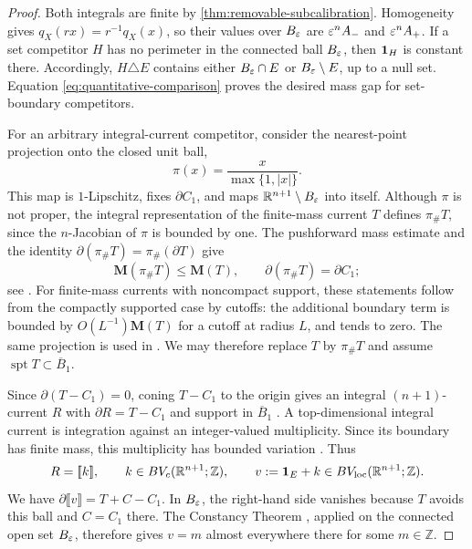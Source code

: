 \begin{proof}
Both integrals are finite by \cref{thm:removable-subcalibration}.
Homogeneity gives \(q_X(rx)=r^{-1}q_X(x)\), so their values over
\(B_\varepsilon\) are \(\varepsilon^nA_-\) and \(\varepsilon^nA_+\).
If a set competitor \(H\) has no perimeter in the connected ball
\(B_\varepsilon\), then \(\mathbf 1_H\) is constant there.  Accordingly,
\(H\triangle E\) contains either \(B_\varepsilon\cap E\) or
\(B_\varepsilon\setminus E\), up to a null set.
Equation \eqref{eq:quantitative-comparison} proves the desired mass gap
for set-boundary competitors.

For an arbitrary integral-current competitor, consider the nearest-point
projection onto the closed unit ball,
\[
 \pi(x)=\frac{x}{\max\{1,|x|\}}.
\]
This map is \(1\)-Lipschitz, fixes \(\partial C_1\), and maps
\(\mathbb R^{n+1}\setminus B_\varepsilon\) into itself.
Although \(\pi\) is not proper, the integral representation of the
finite-mass current \(T\) defines \(\pi_\#T\), since the
\(n\)-Jacobian of \(\pi\) is bounded by one.
The pushforward mass estimate and the identity
\(\partial(\pi_\#T)=\pi_\#(\partial T)\)
give
\[
 \mathbf M(\pi_\#T)\leq\mathbf M(T),
 \qquad \partial(\pi_\#T)=\partial C_1;
\]
see \cite[Remark~26.21(1), Lemma~26.25, and
Remark~27.2(3)]{Simon83}.  For finite-mass currents with noncompact
support, these statements follow from the compactly supported case by
cutoffs: the additional boundary term is bounded by
\(O(L^{-1})\mathbf M(T)\) for a cutoff at radius \(L\), and tends to
zero.  The same projection is used in
\cite[proof of Proposition~1.2]{DeLellisSpadaroSpolaor17}.
We may therefore replace \(T\) by \(\pi_\#T\) and assume
\(\operatorname{spt}T\subset\overline B_1\).

Since \(\partial(T-C_1)=0\), coning \(T-C_1\) to the origin gives an
integral \((n+1)\)-current \(R\) with
\(\partial R=T-C_1\) and support in \(\overline B_1\)
\cite[equation~(26.26) and Remark~27.2(2)--(3)]{Simon83}.
A top-dimensional integral current is integration against an
integer-valued multiplicity.  Since its boundary has finite mass, this
multiplicity has bounded variation
\cite[Remark~26.28]{Simon83}.  Thus
\[
 R=[\![ k]\!],
 \qquad k\in BV_c(\mathbb R^{n+1};\mathbb Z),
 \qquad v:=\mathbf 1_E+k\in BV_{\mathrm{loc}}(\mathbb R^{n+1};\mathbb Z).
\]
We have \(\partial\llbracket v\rrbracket=T+C-C_1\).
In \(B_\varepsilon\), the right-hand side vanishes because \(T\) avoids
this ball and \(C=C_1\) there.  The Constancy Theorem
\cite[Theorem~26.27]{Simon83}, applied on the connected
open set \(B_\varepsilon\), therefore gives \(v=m\) almost everywhere
there for some \(m\in\mathbb Z\).


\end{proof}
